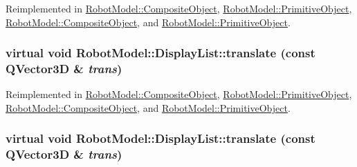 Reimplemented in \hyperlink{class_robot_model_1_1_composite_object_ad44b9c1759209367754dafd77c984d6f}{RobotModel::CompositeObject}, \hyperlink{class_robot_model_1_1_primitive_object_a07ece283ed8f0f0e3cdf6f36ac7b34dd}{RobotModel::PrimitiveObject}, \hyperlink{class_robot_model_1_1_composite_object_a3e9c7e78a85dc50e5327d5b5c99cc67e}{RobotModel::CompositeObject}, and \hyperlink{class_robot_model_1_1_primitive_object_a33c01b56d7daf2e1d94419f25b9fa902}{RobotModel::PrimitiveObject}.\hypertarget{class_robot_model_1_1_display_list_a6eb574d1f9929d9e2141dbacdeeb1b6a}{
\subsubsection[{translate}]{\setlength{\rightskip}{0pt plus 5cm}virtual void RobotModel::DisplayList::translate (const QVector3D \& {\em trans})}}
\label{class_robot_model_1_1_display_list_a6eb574d1f9929d9e2141dbacdeeb1b6a}


Reimplemented in \hyperlink{class_robot_model_1_1_composite_object_afd942b7fa3b18bcc01c3fba417a6c027}{RobotModel::CompositeObject}, \hyperlink{class_robot_model_1_1_primitive_object_ae41a1dcacd77b59c44409a77b0183a77}{RobotModel::PrimitiveObject}, \hyperlink{class_robot_model_1_1_composite_object_a7704da6de6211738327170423c1a3d83}{RobotModel::CompositeObject}, and \hyperlink{class_robot_model_1_1_primitive_object_aeddf2c45f6a3d60f2566e58728cc2a96}{RobotModel::PrimitiveObject}.\hypertarget{class_robot_model_1_1_display_list_a6eb574d1f9929d9e2141dbacdeeb1b6a}{
\subsubsection[{translate}]{\setlength{\rightskip}{0pt plus 5cm}virtual void RobotModel::DisplayList::translate (const QVector3D \& {\em trans})}}
\label{class_robot_model_1_1_display_list_a6eb574d1f9929d9e2141dbacdeeb1b6a}


